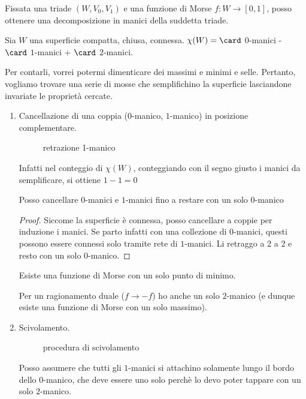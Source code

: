 
Fissata una triade $(W, V_0, V_1)$ e una funzione di Morse $f:W \rightarrow \left [0,1\right ]  $, posso ottenere una decomposizione in manici della suddetta triade.

\begin{es}
 Sia $W$ una superficie compatta, chiusa, connessa.
 $\chi(W) = \card$ $0$-manici - $\card$ $1$-manici + $\card$ $2$-manici.
\end{es}

Per contarli, vorrei potermi dimenticare dei massimi e minimi e selle. 
Pertanto, vogliamo trovare una serie di mosse che semplifichino la superficie lasciandone invariate le proprietà cercate.

\begin{enumerate}
 \item Cancellazione di una coppia ($0$-manico, $1$-manico) in posizione complementare.
 \begin{figure}
    \centering
    
    \caption{retrazione 1-manico}
\end{figure}
  Infatti nel conteggio di $\chi (W)$, conteggiando con il segno giusto i manici da semplificare, si ottiene $1-1 = 0$
  \begin{teo}
    Posso cancellare $0$-manici e $1$-manici fino a restare con un solo $0$-manico
  \end{teo}
  \begin{proof}
    Siccome la superficie è connessa, posso cancellare a coppie per induzione i manici. Se parto infatti con una collezione di $0$-manici, questi possono essere connessi solo tramite rete di $1$-manici.
    Li retraggo a 2 a 2 e resto con un solo $0$-manico.
  \end{proof}
  \begin{cor}
  Esiste una funzione di Morse con un solo punto di minimo.
  \end{cor}
  \begin{oss}
  Per un ragionamento duale ($f\rightarrow -f$) ho anche un solo $2$-manico (e dunque esiste una funzione di Morse con un solo massimo).
  \end{oss}
\item Scivolamento.
\begin{figure}
    \centering
    
    \caption{procedura di scivolamento}
\end{figure}
Posso assumere che tutti gli $1$-manici si attachino solamente lungo il bordo dello $0$-manico, che deve essere uno solo perchè lo devo poter tappare con un solo $2$-manico.
\end{enumerate}

